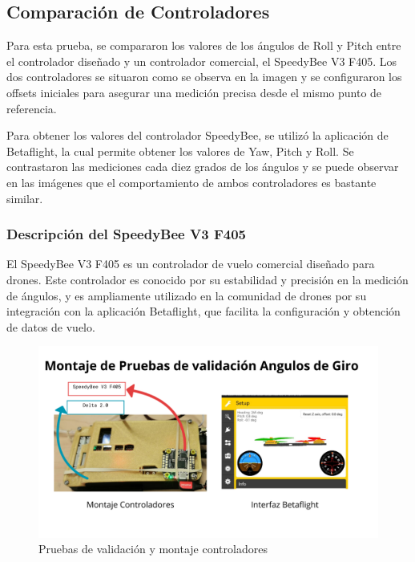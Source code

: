    \subsection{Comparación de Controladores}
        \vspace{5 px}
        Para esta prueba, se compararon los valores de los ángulos de Roll y Pitch entre el controlador diseñado y un controlador comercial, el SpeedyBee V3 F405. Los dos controladores se situaron como se observa en la imagen y se configuraron los offsets iniciales para asegurar una medición precisa desde el mismo punto de referencia.
        \vspace{5 px}


        Para obtener los valores del controlador SpeedyBee, se utilizó la aplicación de Betaflight, la cual permite obtener los valores de Yaw, Pitch y Roll. Se contrastaron las mediciones cada diez grados de los ángulos y se puede observar en las imágenes que el comportamiento de ambos controladores es bastante similar.
        \vspace{5 px}
    \subsubsection{Descripción del SpeedyBee V3 F405}
        \vspace{5 px}
        El SpeedyBee V3 F405 es un controlador de vuelo comercial diseñado para drones. Este controlador es conocido por su estabilidad y precisión en la medición de ángulos, y es ampliamente utilizado en la comunidad de drones por su integración con la aplicación Betaflight, que facilita la configuración y obtención de datos de vuelo.
        \vspace{5 px}
        \begin{figure}[H]
            \centering
            \includegraphics[width=\textwidth]{Imagenes/Pruebas/montajeControladores.png}
            \caption{Pruebas de validación y montaje controladores }
            \label{fig:pruebasPWM}
        \end{figure}



